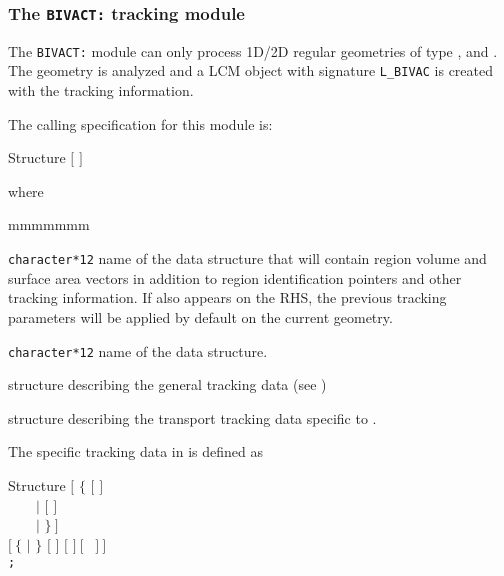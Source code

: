 \subsubsection{The {\tt BIVACT:} tracking module}\label{sect:BIVACData}

The {\tt BIVACT:} module can only process 1D/2D regular geometries
of type ,  and . The geometry is analyzed and
a LCM object with signature {\tt L\_BIVAC} is created with the tracking information.

\vskip 0.2cm

The calling specification for this module is:

\begin{DataStructure}{Structure }
\moc{:=}  $[$  $]$ 
 \moc{::}   
\end{DataStructure}

\noindent  where
\begin{ListeDeDescription}{mmmmmmm}

\item[\dusa{TRKNAM}] {\tt character*12} name of the  data
structure that will contain region volume and surface area vectors in
addition to region identification pointers and other tracking information.
If  also appears on the RHS, the previous tracking 
parameters will be applied by default on the current geometry.

\item[\dusa{GEONAM}] {\tt character*12} name of the  data
structure.

\item[\dstr{desctrack}] structure describing the general tracking data (see
)

\item[\dstr{descbivac}] structure describing the transport tracking data
specific to .

\end{ListeDeDescription}

\vskip 0.2cm

The  specific tracking data in  is defined as

\begin{DataStructure}{Structure }
$[$ $\{$  $[$   $]$ \\
~~~~$|$  $[$   $]$ \\
~~~~$|$  $\}~]$ \\
$[~\{$  $|$  $\}$ $[$  $]$  $[$   $]~[$  ~$]~]$ \\
{\tt ;}
\end{DataStructure}

